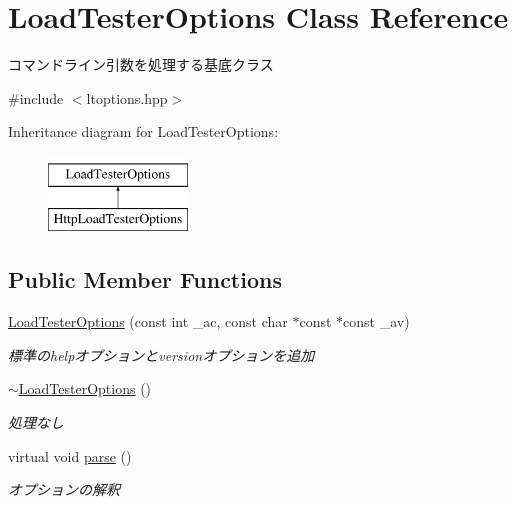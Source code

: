 \hypertarget{class_load_tester_options}{}\section{Load\+Tester\+Options Class Reference}
\label{class_load_tester_options}


コマンドライン引数を処理する基底クラス  




{\ttfamily \#include $<$ltoptions.\+hpp$>$}

Inheritance diagram for Load\+Tester\+Options\+:\begin{figure}[H]
\begin{center}
\leavevmode
\includegraphics[height=2.000000cm]{class_load_tester_options}
\end{center}
\end{figure}
\subsection*{Public Member Functions}
\begin{DoxyCompactItemize}
\item 
\mbox{\label{class_load_tester_options_a53f0855b8d4e2514b8879ac542efae7e}} 
\mbox{\hyperlink{class_load_tester_options_a53f0855b8d4e2514b8879ac542efae7e}{Load\+Tester\+Options}} (const int \+\_\+ac, const char $\ast$const $\ast$const \+\_\+av)
\begin{DoxyCompactList}\small\item\em 標準のhelpオプションとversionオプションを追加 \end{DoxyCompactList}\item 
\mbox{\label{class_load_tester_options_a165080e42361b6d88cdea91d6edd512d}} 
\mbox{\hyperlink{class_load_tester_options_a165080e42361b6d88cdea91d6edd512d}{$\sim$\+Load\+Tester\+Options}} ()
\begin{DoxyCompactList}\small\item\em 処理なし \end{DoxyCompactList}\item 
virtual void \mbox{\hyperlink{class_load_tester_options_ae444c5c2f49cf71d6c63c2eaaf577f62}{parse}} ()
\begin{DoxyCompactList}\small\item\em オプションの解釈 \end{DoxyCompactList}\end{DoxyCompactItemize}
